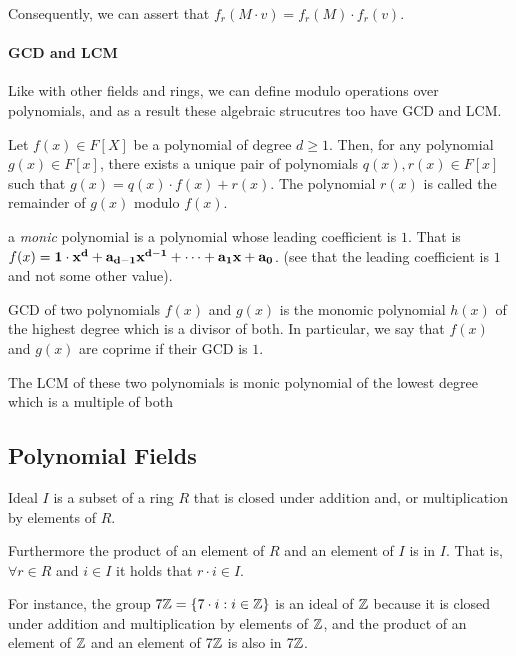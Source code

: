 Consequently, we can assert that $f_r(M\cdot v) = f_r(M)\cdot f_r(v)$.

\paragraph{GCD and LCM}

Like with other fields and rings, 
we can define modulo operations over polynomials, and as a result
these algebraic strucutres too have GCD and LCM.
\begin{definition}
    Let $f(x)\in F[X]$ be a polynomial of degree $d\ge 1$.
    Then, for any polynomial $g(x)\in F[x]$, there exists a unique 
    pair of polynomials $q(x),r(x)\in F[x]$ such that $g(x)=q(x)\cdot f(x) +r(x)$.
    The polynomial $r(x)$ is called the remainder of $g(x)$ modulo $f(x)$.
\end{definition}

\begin{definition} \label{def:monic}
    a \emph{monic} polynomial is a polynomial whose leading coefficient is $1$.
    That is $f(x)= \bf{1}\cdot x^d + a_{d-1}x^{d-1}+\dots +a_1x+a_0$.
    (see that the leading coefficient is $1$ and not some other value).
\end{definition}

\begin{definition}
    GCD of two polynomials $f(x)$ and $g(x)$ is the monomic polynomial $h(x)$
    of the highest degree which is a divisor of both.
    In particular, we say that $f(x)$ and $g(x)$ are coprime if their GCD is $1$.


    The LCM of these two polynomials is monic polynomial of the lowest 
    degree which is a multiple of both
\end{definition}


\subsection{Polynomial Fields}
\begin{definition}
    Ideal $I$ is a subset of a ring $R$ that is closed under addition and, or multiplication by elements of $R$.

    Furthermore the product of an element of $R$ and an element of $I$ is in $I$.
    That is, $\forall r\in R$ and $i\in I$ it holds that $r\cdot i\in I$.
\end{definition}

For instance, the group $7\mathbb{Z}=\{7\cdot i:i\in\mathbb{Z}\}$ is an ideal of $\mathbb{Z}$ because it is closed
under addition and multiplication by elements of $\mathbb{Z}$,
and the product of an element of $\mathbb{Z}$ and an element of $7\mathbb{Z}$ is also in $7\mathbb{Z}$.


